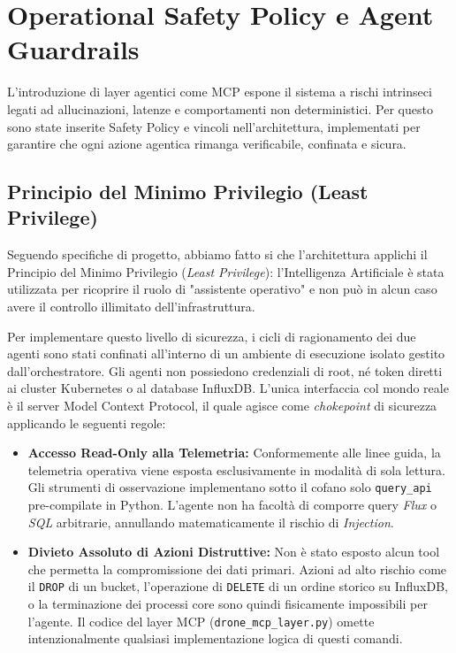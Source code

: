 
\chapter{Operational Safety Policy e Agent Guardrails}
\label{cap:safety_guardrails}

L'introduzione di layer agentici come MCP espone il sistema a rischi intrinseci legati ad allucinazioni, latenze e comportamenti non deterministici. Per questo sono state inserite Safety Policy e vincoli nell'architettura, implementati per garantire che ogni azione agentica rimanga verificabile, confinata e sicura.

\section{Principio del Minimo Privilegio (Least Privilege)}
\label{sec:least_privilege}
Seguendo specifiche di progetto, abbiamo fatto si che l'architettura applichi il Principio del Minimo Privilegio (\textit{Least Privilege}): l'Intelligenza Artificiale è stata utilizzata per ricoprire il ruolo di "assistente operativo" e non può in alcun caso avere il controllo illimitato dell'infrastruttura.

Per implementare questo livello di sicurezza, i cicli di ragionamento dei due agenti sono stati confinati all'interno di un ambiente di esecuzione isolato gestito dall'orchestratore. Gli agenti non possiedono credenziali di root, né token diretti ai cluster Kubernetes o al database InfluxDB. L'unica interfaccia col mondo reale è il server Model Context Protocol, il quale agisce come \textit{chokepoint} di sicurezza applicando le seguenti regole:

\begin{itemize}
    \item \textbf{Accesso Read-Only alla Telemetria:} Conformemente alle linee guida, la telemetria operativa viene esposta esclusivamente in modalità di sola lettura. Gli strumenti di osservazione implementano sotto il cofano solo \texttt{query\_api} pre-compilate in Python. L'agente non ha facoltà di comporre query \textit{Flux} o \textit{SQL} arbitrarie, annullando matematicamente il rischio di \textit{Injection}.
    
    \item \textbf{Divieto Assoluto di Azioni Distruttive:} Non è stato esposto alcun tool che permetta la compromissione dei dati primari. Azioni ad alto rischio come il \texttt{DROP} di un bucket, l'operazione di \texttt{DELETE} di un ordine storico su InfluxDB, o la terminazione dei processi core sono quindi fisicamente impossibili per l'agente. Il codice del layer MCP (\texttt{drone\_mcp\_layer.py}) omette intenzionalmente qualsiasi implementazione logica di questi comandi.
\end{itemize}

